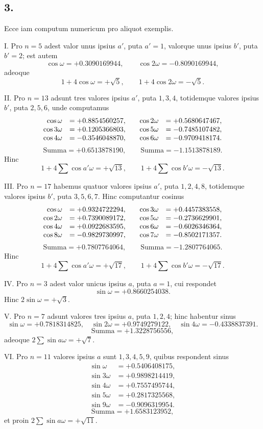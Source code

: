 \documentclass[12pt]{article}
\begin{document}
\subsection*{3.}

Ecce iam computum numericum pro aliquot exemplis.

I. Pro $n=5$ adest valor unus ipsius $a'$, puta $a'=1$, valorque unus ipsius $b'$, puta $b'=2$; est autem
\[
\cos\omega=+0.3090169944,\qquad \cos2\omega=-0.8090169944,
\]
adeoque
\[
1+4\cos\omega=+\sqrt5,\qquad 1+4\cos2\omega=-\sqrt5.
\]

II. Pro $n=13$ adsunt tres valores ipsius $a'$, puta $1,3,4$, totidemque valores ipsius $b'$, puta $2,5,6$, unde computamus
\[
\begin{array}{rl@{\qquad}rl}
\cos\omega &= +0.8854560257,& \cos2\omega &= +0.5680647467,\\
\cos3\omega &= +0.1205366803,& \cos5\omega &= -0.7485107482,\\
\cos4\omega &= -0.3546048870,& \cos6\omega &= -0.9709418174.
\end{array}
\]
\[
\text{Summa}=+0.6513878190,\qquad \text{Summa}=-1.1513878189.
\]
Hinc
\[
1+4\sum\cos a'\omega=+\sqrt{13},\qquad
1+4\sum\cos b'\omega=-\sqrt{13}.
\]

III. Pro $n=17$ habemus quatuor valores ipsius $a'$, puta $1,2,4,8$, totidemque valores ipsius $b'$, puta $3,5,6,7$. Hinc computantur cosinus
\[
\begin{array}{rl@{\qquad}rl}
\cos\omega &= +0.9324722294,& \cos3\omega &= +0.4457383558,\\
\cos2\omega &= +0.7390089172,& \cos5\omega &= -0.2736629901,\\
\cos4\omega &= +0.0922683595,& \cos6\omega &= -0.6026346364,\\
\cos8\omega &= -0.9829730997,& \cos7\omega &= -0.8502171357.
\end{array}
\]
\[
\text{Summa}=+0.7807764064,\qquad \text{Summa}=-1.2807764065.
\]
Hinc
\[
1+4\sum\cos a'\omega=+\sqrt{17},\qquad
1+4\sum\cos b'\omega=-\sqrt{17}.
\]

IV. Pro $n=3$ adest valor unicus ipsius $a$, puta $a=1$, cui respondet
\[
\sin\omega=+0.8660254038.
\]
Hinc $2\sin\omega=+\sqrt3$.

V. Pro $n=7$ adsunt valores tres ipsius $a$, puta $1,2,4$; hinc habentur sinus
\[
\sin\omega=+0.7818314825,\quad
\sin2\omega=+0.9749279122,\quad
\sin4\omega=-0.4338837391.
\]
\[
\text{Summa}=+1.3228756556,
\]
adeoque $2\sum\sin a\omega=+\sqrt7$.

VI. Pro $n=11$ valores ipsius $a$ sunt $1,3,4,5,9$, quibus respondent sinus
\[
\begin{array}{rl}
\sin\omega &= +0.5406408175,\\
\sin3\omega &= +0.9898214419,\\
\sin4\omega &= +0.7557495744,\\
\sin5\omega &= +0.2817325568,\\
\sin9\omega &= -0.9096319954.
\end{array}
\]
\[
\text{Summa}=+1.6583123952,
\]
et proin $2\sum\sin a\omega=+\sqrt{11}$.
\end{document}
